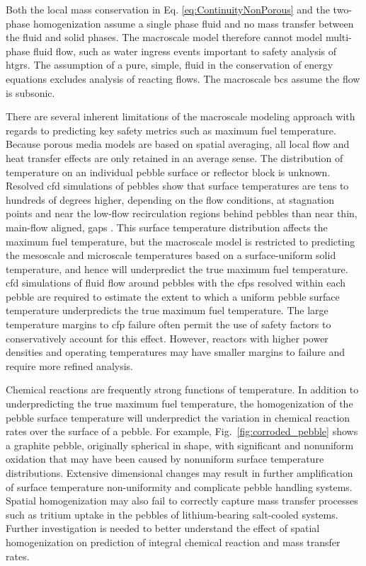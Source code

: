 Both the local mass conservation in Eq. \eqref{eq:ContinuityNonPorous} and the two-phase homogenization assume a single phase fluid and no mass transfer between the fluid and solid phases. The macroscale model therefore cannot model multi-phase fluid flow, such as water ingress events important to safety analysis of \glspl{htgr}. The assumption of a pure, simple, fluid in the conservation of energy equations excludes analysis of reacting flows. The macroscale \glspl{bc} assume the flow is subsonic. 

There are several inherent limitations of the macroscale modeling approach with regards to predicting key safety metrics such as maximum fuel temperature. Because porous media models are based on spatial averaging, all local flow and heat transfer effects are only retained in an average sense. The distribution of temperature on an individual pebble surface or reflector block is unknown. Resolved \gls{cfd} simulations of pebbles show that surface temperatures are tens to hundreds of degrees higher, depending on the flow conditions, at stagnation points and near the low-flow recirculation regions behind pebbles than near thin, main-flow aligned, gaps \cite{bai,ferng,ge,lee2007,song,wu2010}. This surface temperature distribution affects the maximum fuel temperature, but the macroscale model is restricted to predicting the mesoscale and microscale temperatures based on a surface-uniform solid temperature, and hence will underpredict the true maximum fuel temperature. \gls{cfd} simulations of fluid flow around pebbles with the \glspl{cfp} resolved within each pebble are required to estimate the extent to which a uniform pebble surface temperature underpredicts the true maximum fuel temperature. The large temperature margins to \gls{cfp} failure often permit the use of safety factors to conservatively account for this effect. However, reactors with higher power densities and operating temperatures may have smaller margins to failure and require more refined analysis.

Chemical reactions are frequently strong functions of temperature. In addition to underpredicting the true maximum fuel temperature, the homogenization of the pebble surface temperature will underpredict the variation in chemical reaction rates over the surface of a pebble. For example, Fig.\ \ref{fig:corroded_pebble} shows a graphite pebble, originally spherical in shape, with significant and nonuniform oxidation that may have been caused by nonuniform surface temperature distributions. Extensive dimensional changes may result in further amplification of surface temperature non-uniformity and complicate pebble handling systems. Spatial homogenization may also fail to correctly capture mass transfer processes such as tritium uptake in the pebbles of lithium-bearing salt-cooled systems. Further investigation is needed to better understand the effect of spatial homogenization on prediction of integral chemical reaction and mass transfer rates.

